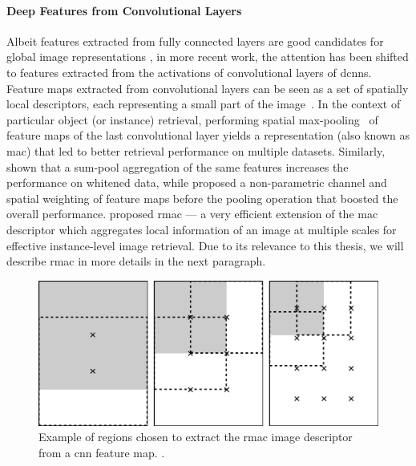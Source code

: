 \paragraph{Deep Features from Convolutional Layers}
Albeit features extracted from fully connected layers are good candidates for global image representations%
, in more recent work, the attention has been shifted to features extracted from the activations of convolutional layers of \glspl{dcnn}.
Feature maps extracted from convolutional layers can be seen as a set of spatially local descriptors, each representing a small part of the image~\cite{liu2015treasure}.
In the context of particular object (or instance) retrieval, performing spatial max-pooling~\cite{azizpour2015generic,razavian2016visual} of feature maps of the last convolutional layer yields a representation (also known as \gls{mac}) that led to better retrieval performance on multiple datasets.
Similarly, \citet{babenko2015aggregating} shown that a sum-pool aggregation of the same features increases the performance on whitened data, while \citet{kalantidis2016cross} proposed a non-parametric channel and spatial weighting of feature maps before the pooling operation that boosted the overall performance.
\citet{tolias2016rmac} proposed \gls{rmac} --- a very efficient extension of the \gls{mac} descriptor which aggregates local information of an image at multiple scales for effective instance-level image retrieval.
Due to its relevance to this thesis, we will describe \gls{rmac} in more details in the next paragraph.

\begin{figure}
    \centering
    \includegraphics[width=0.6\linewidth]{rmac-regions}
    \caption{Example of regions chosen to extract the \gls{rmac} image descriptor from a \gls{cnn} feature map. .}
    \label{fig:back:rmac-regions}
\end{figure}

